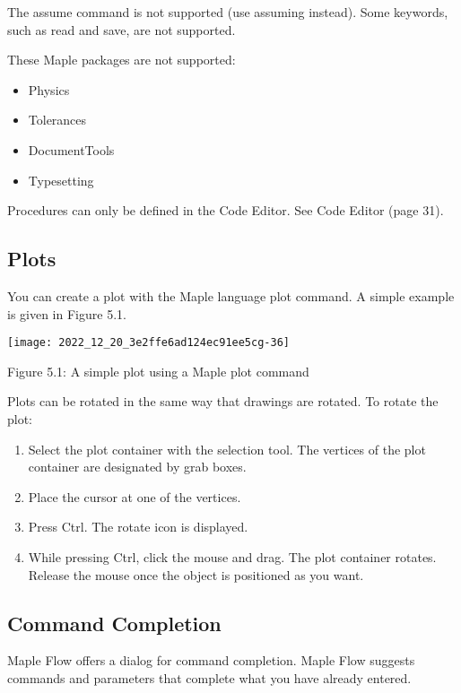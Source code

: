 The assume command is not supported (use assuming instead). Some keywords, such as read and save, are not supported.

These Maple packages are not supported:

\begin{itemize}
  \item Physics

  \item Tolerances

  \item DocumentTools

  \item Typesetting

\end{itemize}

Procedures can only be defined in the Code Editor. See Code Editor (page 31).

\subsection{Plots}
You can create a plot with the Maple language plot command. A simple example is given in Figure 5.1.

\begin{center}
\texttt{[image: 2022\_12\_20\_3e2ffe6ad124ec91ee5cg-36]}
\end{center}

Figure 5.1: A simple plot using a Maple plot command

Plots can be rotated in the same way that drawings are rotated. To rotate the plot:

\begin{enumerate}
  \item Select the plot container with the selection tool. The vertices of the plot container are designated by grab boxes.

  \item Place the cursor at one of the vertices.

  \item Press Ctrl. The rotate icon is displayed.

  \item While pressing Ctrl, click the mouse and drag. The plot container rotates. Release the mouse once the object is positioned as you want.

\end{enumerate}

\subsection{Command Completion}
Maple Flow offers a dialog for command completion. Maple Flow suggests commands and parameters that complete what you have already entered.

